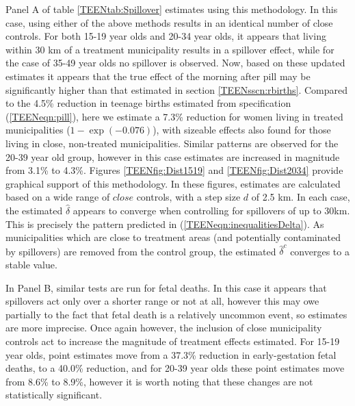Panel A of table \ref{TEENtab:Spillover} estimates using this methodology.  In
this case, using either of the above methods results in an identical number of 
close controls.  For both 15-19 year olds and 20-34 year olds, it appears that
living within 30 km of a treatment municipality results in a spillover effect,
while for the case of 35-49 year olds no spillover is observed.  Now, based on
these updated estimates it appears that the true effect of the morning after 
pill may be significantly higher than that estimated in section 
\ref{TEENsscn:rbirths}.  Compared to the 4.5\% reduction in teenage births 
estimated from specification (\ref{TEENeqn:pill}), here we estimate a 7.3\% 
reduction for women living in treated municipalities ($1-\exp(-0.076)$), with
sizeable effects also found for those living in close, non-treated 
municipalities.  Similar patterns are observed for the 20-39 year old group,
however in this case estimates are increased in magnitude from 3.1\% to 4.3\%.
Figures \ref{TEENfig:Dist1519} and \ref{TEENfig:Dist2034} provide graphical
support of this methodology.  In these figures, estimates are calculated based 
on a wide range of $close$ controls, with a step size $d$ of 2.5 km.  In each 
case, the estimated $\hat\delta$ appears to converge when controlling for 
spillovers of up to 30km.  This is precisely the pattern predicted in 
(\ref{TEENeqn:inequalitiesDelta}).  As municipalities which are close to
treatment areas (and potentially contaminated by spillovers) are removed from 
the control group, the estimated $\hat\delta^c$ converges to a stable value.

In Panel B, similar tests are run for fetal deaths.  In this case it appears 
that spillovers act only over a shorter range or not at all, however this may 
owe partially to the fact that fetal death is a relatively uncommon event, so 
estimates are more imprecise.  Once again however, the inclusion of close 
municipality controls act to increase the magnitude of treatment effects 
estimated.  For 15-19 year olds, point estimates move from a 37.3\% reduction 
in early-gestation fetal deaths, to a 40.0\% reduction, and for 20-39 year olds
these point estimates move from 8.6\% to 8.9\%, however it is worth noting 
that these changes are not statistically significant.


